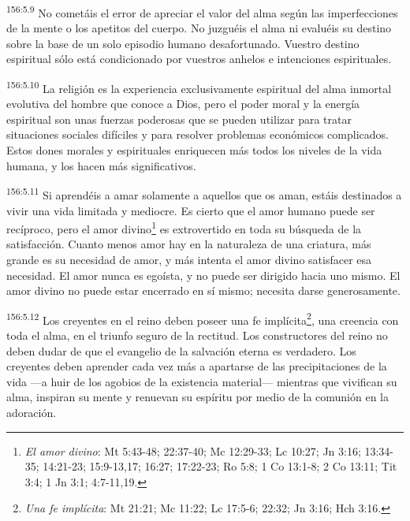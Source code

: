 \par 
\textsuperscript{156:5.9} No cometáis el error de apreciar el valor del alma según las imperfecciones de la mente o los apetitos del cuerpo. No juzguéis el alma ni evaluéis su destino sobre la base de un solo episodio humano desafortunado. Vuestro destino espiritual sólo está condicionado por vuestros anhelos e intenciones espirituales.

\par 
\textsuperscript{156:5.10} La religión es la experiencia exclusivamente espiritual del alma inmortal evolutiva del hombre que conoce a Dios, pero el poder moral y la energía espiritual son unas fuerzas poderosas que se pueden utilizar para tratar situaciones sociales difíciles y para resolver problemas económicos complicados. Estos dones morales y espirituales enriquecen más todos los niveles de la vida humana, y los hacen más significativos.

\par 
\textsuperscript{156:5.11} Si aprendéis a amar solamente a aquellos que os aman, estáis destinados a vivir una vida limitada y mediocre. Es cierto que el amor humano puede ser recíproco, pero el amor divino\footnote{\textit{El amor divino}: Mt 5:43-48; 22:37-40; Mc 12:29-33; Lc 10:27; Jn 3:16; 13:34-35; 14:21-23; 15:9-13,17; 16:27; 17:22-23; Ro 5:8; 1 Co 13:1-8; 2 Co 13:11; Tit 3:4; 1 Jn 3:1; 4:7-11,19.} es extrovertido en toda su búsqueda de la satisfacción. Cuanto menos amor hay en la naturaleza de una criatura, más grande es su necesidad de amor, y más intenta el amor divino satisfacer esa necesidad. El amor nunca es egoísta, y no puede ser dirigido hacia uno mismo. El amor divino no puede estar encerrado en sí mismo; necesita darse generosamente.

\par 
\textsuperscript{156:5.12} Los creyentes en el reino deben poseer una fe implícita\footnote{\textit{Una fe implícita}: Mt 21:21; Mc 11:22; Lc 17:5-6; 22:32; Jn 3:16; Hch 3:16.}, una creencia con toda el alma, en el triunfo seguro de la rectitud. Los constructores del reino no deben dudar de que el evangelio de la salvación eterna es verdadero. Los creyentes deben aprender cada vez más a apartarse de las precipitaciones de la vida ---a huir de los agobios de la existencia material--- mientras que vivifican su alma, inspiran su mente y renuevan su espíritu por medio de la comunión en la adoración.

